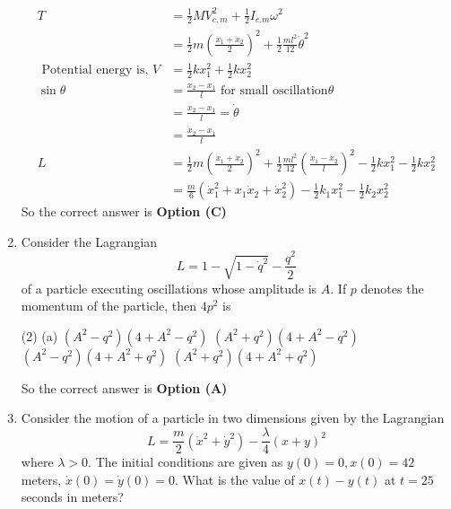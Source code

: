 \begin{enumerate}
\begin{tasks}
	\end{tasks}
\begin{answer}
	\begin{align*}
	T&=\frac{1}{2} M V_{c, m}^{2}+\frac{1}{2} I_{c . m} \omega^{2}\\&=\frac{1}{2} m\left(\frac{\dot{x}_{1}+\dot{x}_{2}}{2}\right)^{2}+\frac{1}{2} \frac{m l^{2}}{12} \dot{\theta}^{2}\\
	\text{	Potential energy is, }V&=\frac{1}{2} k x_{1}^{2}+\frac{1}{2} k x_{2}^{2}\\
	\sin \theta&=\frac{x_{2}-x_{1}}{l}\text{ for small oscillation} \theta\\&=\frac{x_{2}-x_{1}}{l}=\dot{\theta}\\&=\frac{\dot{x}_{2}-\dot{x}_{1}}{l}\\
	L&=\frac{1}{2} m\left(\frac{\dot{x}_{1}+\dot{x}_{2}}{2}\right)^{2}+\frac{1}{2} \frac{m l^{2}}{12}\left(\frac{\dot{x}_{1}-\dot{x}_{2}}{l}\right)^{2}-\frac{1}{2} k x_{1}^{2}-\frac{1}{2} k x_{2}^{2}\\
	&=\frac{m}{6}\left(\dot{x}_{1}^{2}+x_{1} \dot{x}_{2}+\dot{x}_{2}^{2}\right)-\frac{1}{2} k_{1} x_{1}^{2}-\frac{1}{2} k_{2} x_{2}^{2}
	\end{align*}
	So the correct answer is \textbf{Option (C)}
\end{answer}
	\item Consider the Lagrangian
	$$L=1-\sqrt{1-\dot{q}^{2}}-\frac{q^{2}}{2}$$
	of a particle executing oscillations whose amplitude is $A$. If $p$ denotes the momentum of the particle, then $4 p^{2}$ is
	{}
	\begin{tasks}(2)
		\task[\textbf{A.}] (a) $\left(A^{2}-q^{2}\right)\left(4+A^{2}-q^{2}\right)$
		\task[\textbf{B.}] $\left(A^{2}+q^{2}\right)\left(4+A^{2}-q^{2}\right)$
		\task[\textbf{C.}] $\left(A^{2}-q^{2}\right)\left(4+A^{2}+q^{2}\right)$
		\task[\textbf{D.}] $\left(A^{2}+q^{2}\right)\left(4+A^{2}+q^{2}\right)$
	\end{tasks}	
\begin{answer}
	So the correct answer is \textbf{Option (A)}
\end{answer}
	\item Consider the motion of a particle in two dimensions given by the Lagrangian $$L=\frac{m}{2}\left(\dot{x}^{2}+\dot{y}^{2}\right)-\frac{\lambda}{4}(x+y)^{2}$$
	where $\lambda>0$. The initial conditions are given as $y(0)=0, x(0)=42$ meters, $\dot{x}(0)=\dot{y}(0)=0$. What is the value of $x(t)-y(t)$ at $t=25$ seconds in meters?
	{}
	\begin{answer}

\end{answer}
\end{enumerate}
